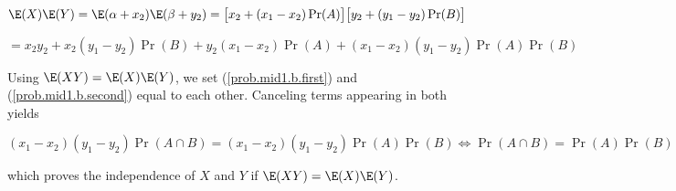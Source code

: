 \begin{enumerate}[(1)]
\begin{enumerate}[(a)]
\[
\E(X) \E(Y) = \E(\alpha + x_2) \E(\beta + y_2) = \big[x_2 + (x_1 - x_2) \Pr(A) \big] \big[y_2 + (y_1 - y_2) \Pr(B) \big]
\]

\begin{equation}\label{prob.mid1.b.second}
= x_2 y_2 + x_2(y_1 - y_2)\Pr(B) + y_2(x_1 -x_2) \Pr(A) + (x_1 - x_2)(y_1 - y_2) \Pr(A)\Pr(B)
\end{equation}


Using \(\E(XY) = \E(X) \E(Y)\), we set (\ref{prob.mid1.b.first}) and (\ref{prob.mid1.b.second}) equal to each other. Canceling terms appearing in both yields

\[
(x_1 - x_2)(y_1 - y_2) \Pr(A \cap B) = (x_1 - x_2)(y_1 - y_2) \Pr(A)\Pr(B) \iff \Pr(A \cap B) = \Pr(A)\Pr(B)
\]

which proves the independence of \(X\) and \(Y\) if \(\E(XY) = \E(X) \E(Y)\).


\end{enumerate}

%
%
%
%
%
%
%
%


%
%
%
%



\end{enumerate}
